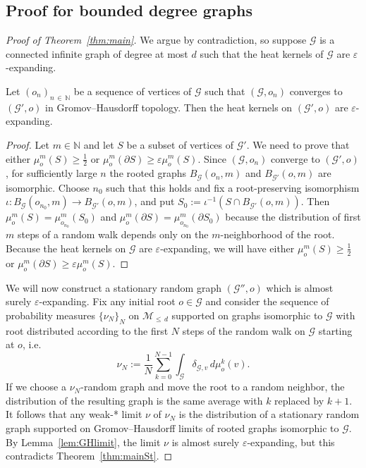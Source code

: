 \documentclass[AHL,Unicode,longabstracts,published]{cedram}
\newcommand{\bbN}{\mathbb{N}}
\newcommand{\calM}{\mathcal{M}}
\newcommand{\calG}{\mathcal{G}}
\begin{document}
\subsection{Proof for bounded degree graphs} \label{sec:graph_proof}

\begin{proof}[Proof of Theorem~\ref{thm:main}] We argue by contradiction, so suppose $\calG$ is a connected infinite graph of degree at most $d$ such that the heat kernels of $\calG$ are $\varepsilon$-expanding.

\begin{lemm}\label{lem:GHlimit}
Let $(o_n)_{n\,\in\,\bbN}$ be a sequence of vertices of $\calG$ such that $(\calG,o_n)$ converges to $(\calG',o)$ in Gromov--Hausdorff topology. Then the heat kernels on $(\calG',o)$ are $\varepsilon$-expanding.
\end{lemm}

\begin{proof}
Let $m\in\bbN$ and let $S$ be a subset of vertices of $\calG'$. We need to prove that either $\mu_o^m(S)\geq \frac{1}{2}$ or $\mu_o^m(\partial S)\geq \varepsilon \mu_o^m(S).$ Since $(\calG,o_n)$ converge to $(\calG',o)$, for sufficiently large $n$ the rooted graphs $B_{\calG}(o_n,m)$ and $B_{\calG'}(o,m)$ are isomorphic. Choose $n_0$ such that this holds and fix a root-preserving isomorphism $\iota: B_{\calG}(o_{n_0},m) \to B_{\calG'}(o,m)$, and put $S_0:=\iota^{-1}(S\cap B_{\calG'}(o,m)).$ Then $\mu_o^m(S)=\mu_{o_{n_0}}^m(S_0)$ and $\mu_o^m(\partial S)=\mu_{o_{n_0}}^m(\partial S_0)$ because the distribution of first $m$ steps of a random walk depends only on the $m$-neighborhood of the root. Because the heat kernels on $\calG$ are $\varepsilon$-expanding, we will have either $\mu_o^m(S)\geq \frac{1}{2}$ or $\mu_o^m(\partial S)\geq \varepsilon \mu_o^m(S).$
\end{proof}

We will now construct a stationary random graph $(\calG'',o)$ which is almost surely $\varepsilon$-expanding. Fix any initial root $o\in \calG$ and consider the sequence of probability measures $\{\nu_N\}_N$ on $\calM_{\leq\,d}$ supported on graphs isomorphic to $\calG$ with root distributed according to the first $N$ steps of the random walk on $\calG$ starting at $o$, i.e.
\[
\nu_N:=\frac{1}{N}\sum_{k=0}^{N-1} \int_{\calG}\delta_{\calG,v} \, d\mu_{o}^{k}(v).
\]
If we choose a $\nu_N$-random graph and move the root to a random neighbor, the distribution of the resulting graph is the same average with $k$ replaced by $k+1$. It follows that any weak-* limit $\nu$ of $\nu_N$ is the distribution of a stationary random graph supported on Gromov--Hausdorff limits of rooted graphs isomorphic to $\calG$. By Lemma~\ref{lem:GHlimit}, the limit $\nu$ is almost surely $\varepsilon$-expanding, but this contradicts Theorem~\ref{thm:mainSt}.
\end{proof}
\end{document}
